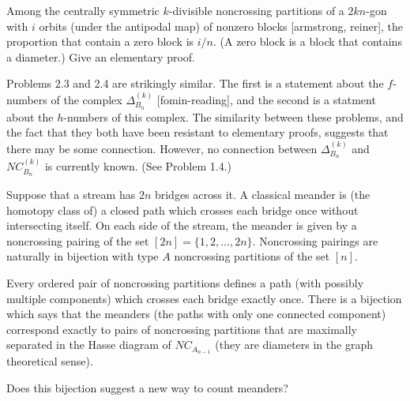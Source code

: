 \documentclass[12pt,letterpaper, reqno]{amsart}
\begin{document}
\begin{problemblock}
\begin{problem}[2.4] 
Among the centrally symmetric $k$-divisible noncrossing partitions of
a $2kn$-gon with $i$ orbits (under the antipodal map) of nonzero blocks
[armstrong, reiner], the proportion that contain a zero block is $i/n$.
(A zero block is a block that contains a diameter.) Give an elementary proof.
\end{problem}

\begin{remark}
Problems 2.3 and 2.4  are strikingly similar. The first is a statement about the
$f$-numbers of the complex $\Delta_{B_n}^{(k)}$ [fomin-reading], and
the second is a statment about the $h$-numbers of this complex. The
similarity between these problems, and the fact that they both have
been resistant to elementary proofs, suggests that there may be some
connection. However, no connection between $\Delta_{B_n}^{(k)}$ and
$NC_{B_n}^{(k)}$ is currently known. (See Problem 1.4.)
\end{remark}

\end{problemblock}

\begin{problemblock}
Suppose that a stream has $2n$ bridges across it. A classical
meander is (the homotopy class of) a closed path which crosses
each bridge once without intersecting itself. On each side of the
stream, the  meander is given by a noncrossing pairing of the set
$[2n]=\{1,2,\ldots,2n\}$. Noncrossing pairings are naturally in bijection
with type $A$ noncrossing partitions of the set $[n]$.


Every ordered pair of noncrossing partitions defines a path (with possibly
multiple components) which crosses each bridge exactly once. There is a
bijection which says that the meanders (the paths with only one connected
component) correspond exactly to pairs of noncrossing partitions that
are maximally separated in the Hasse diagram of $NC_{A_{n-1}}$ (they
are diameters in the graph theoretical sense).


\begin{problem}[2.5] 
 Does this bijection suggest a new way to count meanders?
\end{problem}
\end{problemblock}
\end{document}
